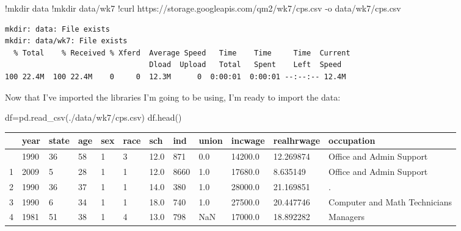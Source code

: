 \documentclass[
  letterpaper,
  DIV=11,
  numbers=noendperiod]{scrreprt}
\newenvironment{Shaded}{\begin{snugshade}}{\end{snugshade}}
\newcommand{\NormalTok}[1]{\textcolor[rgb]{0.00,0.23,0.31}{#1}}
\newcommand{\OperatorTok}[1]{\textcolor[rgb]{0.37,0.37,0.37}{#1}}
\newcommand{\StringTok}[1]{\textcolor[rgb]{0.13,0.47,0.30}{#1}}
\begin{document}
\begin{Shaded}
\begin{Highlighting}[]
\OperatorTok{!}\NormalTok{mkdir data}
\OperatorTok{!}\NormalTok{mkdir data}\OperatorTok{/}\NormalTok{wk7}
\OperatorTok{!}\NormalTok{curl https:}\OperatorTok{//}\NormalTok{storage.googleapis.com}\OperatorTok{/}\NormalTok{qm2}\OperatorTok{/}\NormalTok{wk7}\OperatorTok{/}\NormalTok{cps.csv }\OperatorTok{{-}}\NormalTok{o data}\OperatorTok{/}\NormalTok{wk7}\OperatorTok{/}\NormalTok{cps.csv}
\end{Highlighting}
\end{Shaded}

\begin{verbatim}
mkdir: data: File exists
mkdir: data/wk7: File exists
  % Total    % Received % Xferd  Average Speed   Time    Time     Time  Current
                                 Dload  Upload   Total   Spent    Left  Speed
100 22.4M  100 22.4M    0     0  12.3M      0  0:00:01  0:00:01 --:--:-- 12.4M
\end{verbatim}

Now that I've imported the libraries I'm going to be using, I'm ready to
import the data:

\begin{Shaded}
\begin{Highlighting}[]
\NormalTok{df}\OperatorTok{=}\NormalTok{pd.read\_csv(}\StringTok{\textquotesingle{}./data/wk7/cps.csv\textquotesingle{}}\NormalTok{)}
\NormalTok{df.head()}
\end{Highlighting}
\end{Shaded}

\begin{longtable}[]{@{}llllllllllll@{}}
\toprule\noalign{}
& year & state & age & sex & race & sch & ind & union & incwage &
realhrwage & occupation \\
\midrule\noalign{}
\endhead
\bottomrule\noalign{}
\endlastfoot
0 & 1990 & 36 & 58 & 1 & 3 & 12.0 & 871 & 0.0 & 14200.0 & 12.269874 &
Office and Admin Support \\
1 & 2009 & 5 & 28 & 1 & 1 & 12.0 & 8660 & 1.0 & 17680.0 & 8.635149 &
Office and Admin Support \\
2 & 1990 & 36 & 37 & 1 & 1 & 14.0 & 380 & 1.0 & 28000.0 & 21.169851 &
. \\
3 & 1990 & 6 & 34 & 1 & 1 & 18.0 & 740 & 1.0 & 27500.0 & 20.447746 &
Computer and Math Technicians \\
4 & 1981 & 51 & 38 & 1 & 4 & 13.0 & 798 & NaN & 17000.0 & 18.892282 &
Managers \\
\end{longtable}
\end{document}
